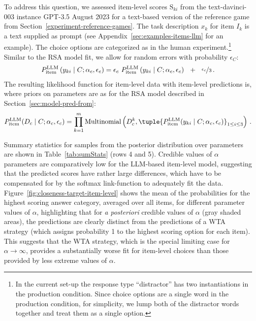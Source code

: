 \documentclass[fleqn]{article}
\begin{document}
To address this question, we assessed item-level scores $\text{S}_{ki}$ from the text-davinci-003 instance GPT-3.5 August 2023 \citep{BrownMann2020:Language-Models} for a text-based version of the reference game from Section~\ref{experiment-reference-games}.
The task description $x_{k}$ for item $I_{k}$ is a text supplied as prompt (see Appendix~\ref{sec:examples-items-llm} for an example).
The choice options are categorized as in the human experiment.\footnote{
  In the current set-up the response type ``distractor'' has two instantiations in the production condition. Since choice options are a single word in the production condition, for simplicity, we lump both of the distractor words together and treat them as a single option.}
Similar to the RSA model fit, we allow for random errors with probability $\epsilon_{C}$:
%
\begin{align*}
  P_{\text{item}}^{\text{LLM}}\left ( y_{ki} \mid C; \alpha_{c}, \epsilon_{c} \right )
  = \epsilon_{c} \  P_{\text{item}}^{\text{LLM}}\left ( y_{ki} \mid C; \alpha_{c}, \epsilon_{c} \right ) \ \ + \ \ \nicefrac{\epsilon_{c}}{3}   \,.
\end{align*}
%
The resulting likelihood function for item-level data with item-level predictions is, where priors on parameters are as for the RSA model described in Section~\ref{sec:model-pred-from}:
%
\begin{align*}
 P^{\text{LLM}}_{\text{item}}(D_{c} \mid C; \alpha_{c}, \epsilon_{c}) = \prod_{k = 1}^{m} \text{Multinomial} \left ( D_{c}^{k}, \tuple{P^{\text{LLM}}_{\text{item}}(y_{ki} \mid C;  \alpha_{c}, \epsilon_{c})}_{1 \le i \le 3} \right )\,.
\end{align*}
%

Summary statistics for samples from the posterior distribution over parameters are shown in Table~\ref{tab:sumStats} (rows 4 and 5).
Credible values of $\alpha$ parameters are comparatively low for the LLM-based item-level model, suggesting that the predicted scores have rather large differences, which have to be compensated for by the softmax link-function to adequately fit the data.
Figure~\ref{fig:closeness-target-item-level} shows the mean of the probabilities for the highest scoring answer category, averaged over all items, for different parameter values of $\alpha$, highlighting that for \textit{a posteriori} credible values of $\alpha$ (gray shaded areas), the predictions are clearly distinct from the predictions of a WTA strategy (which assigns probability 1 to the highest scoring option for each item).
This suggests that the WTA strategy, which is the special limiting case for $\alpha \rightarrow \infty$, provides a substantially worse fit for item-level choices than those provided by less extreme values of $\alpha$.
\end{document}

